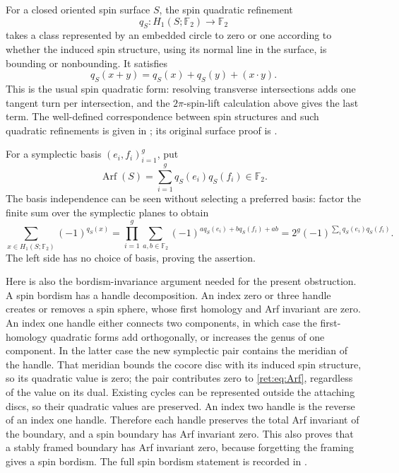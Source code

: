 \documentclass[11pt]{article}
\theoremstyle{definition}
\begin{document}
For a closed oriented spin surface \(S\), the spin quadratic
refinement
\[
 q_S:H_1(S;\mathbb F_2)\longrightarrow\mathbb F_2
\]
takes a class represented by an embedded circle to zero or one
according to whether the induced spin structure, using its normal
line in the surface, is bounding or nonbounding.  It satisfies
\begin{equation}
 q_S(x+y)=q_S(x)+q_S(y)+(x\mathbin{\cdot}y).
 \label{ret:eq:quadratic}
\end{equation}
This is the usual spin quadratic form: resolving transverse
intersections adds one tangent turn per intersection, and the
\(2\pi\)-spin-lift calculation above gives the last term.  The
well-defined correspondence between spin structures and such
quadratic refinements is given in
\cite[Theorem 3.2 and Remark 3.3]{retbib:DebrayGunningham}; its original
surface proof is \cite{retbib:Johnson}.

For a symplectic basis \((e_i,f_i)_{i=1}^g\), put
\begin{equation}
 \operatorname{Arf}(S)=\sum_{i=1}^gq_S(e_i)q_S(f_i)\in\mathbb F_2.
 \label{ret:eq:Arf}
\end{equation}
The basis independence can be seen without selecting a preferred
basis: factor the finite sum over the symplectic planes to obtain
\[
 \sum_{x\in H_1(S;\mathbb F_2)}(-1)^{q_S(x)}
   =\prod_{i=1}^g
     \sum_{a,b\in\mathbb F_2}(-1)^{a q_S(e_i)+b q_S(f_i)+ab}
   =2^g(-1)^{\sum_i q_S(e_i)q_S(f_i)}.
\]
The left side has no choice of basis, proving the assertion.

Here is also the bordism-invariance argument needed for the present
obstruction.  A spin bordism has a handle decomposition.  An index
zero or three handle creates or removes a spin sphere, whose first
homology and Arf invariant are zero.  An index one handle either
connects two components, in which case the first-homology quadratic
forms add orthogonally, or increases the genus of one component.
In the latter case the new symplectic pair contains the meridian
of the handle.  That meridian bounds the cocore disc with its
induced spin structure, so its quadratic value is zero; the pair
contributes zero to \eqref{ret:eq:Arf}, regardless of the value on its
dual.  Existing cycles can be represented outside the attaching
discs, so their quadratic values are preserved.  An index two
handle is the reverse of an index one handle.  Therefore each
handle preserves the total Arf invariant of the boundary, and a
spin boundary has Arf invariant zero.  This also proves that a
stably framed boundary has Arf invariant zero, because forgetting
the framing gives a spin bordism.  The full spin bordism statement
is recorded in \cite[Theorem 3.6]{retbib:DebrayGunningham}.
\end{document}
